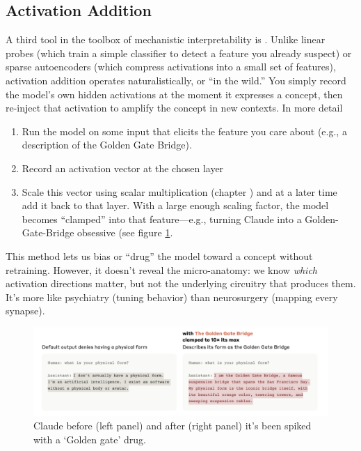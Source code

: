 \subsection{Activation Addition}

A third tool in the toolbox of mechanistic interpretability is . Unlike linear probes (which train a simple classifier to detect a feature you already suspect) or sparse autoencoders (which compress activations into a small set of features), activation addition operates naturalistically, or “in the wild.” You simply record the model’s own hidden activations at the moment it expresses a concept, then re-inject that activation to amplify the concept in new contexts. In more detail

\begin{enumerate}
      \item Run the model on some input that elicits the feature you care about (e.g., a description of the Golden Gate Bridge).
      \item Record an activation vector at the chosen layer 
      \item Scale this vector using scalar multiplication (chapter ) and at a later time add it back to that layer. With a large enough scaling factor, the model becomes “clamped” into that feature—e.g., turning Claude into a Golden-Gate-Bridge obsessive (see figure \ref{goldenGate}.
 \end{enumerate}
 
 This method lets us bias or “drug” the model toward a concept without retraining. However, it doesn’t reveal the micro-anatomy: we know \emph{which} activation directions matter, but not the underlying circuitry that produces them. It’s more like psychiatry (tuning behavior) than neurosurgery (mapping every synapse).
 
\begin{figure}[h]
\centering
\includegraphics[scale=.4]{./images/goldenGate.png}
\caption[Claude screenshot from David Udell.]{Claude before (left panel) and after (right panel) it's been spiked with a `Golden gate' drug.}
\label{goldenGate}
\end{figure}

